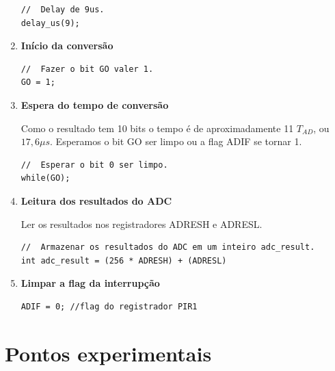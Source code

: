 \documentclass{article}
\begin{document}
\begin{enumerate}
\begin{lstlisting}[style = Matlab-editor, language = C2]
//  Delay de 9us.
delay_us(9);\end{lstlisting}
    
    \item \textbf{Início da conversão} \par

    \begin{lstlisting}[style = Matlab-editor, language = C2]
//  Fazer o bit GO valer 1.
GO = 1;\end{lstlisting}

    \item \textbf{Espera do tempo de conversão} \par
    Como o resultado tem 10 bits o tempo é de aproximadamente 11 $T_{AD}$, ou $17,6\mu s$.
    Esperamos o bit GO ser limpo ou a flag ADIF se tornar 1.

    \begin{lstlisting}[style = Matlab-editor, language = C2]
//  Esperar o bit 0 ser limpo.
while(GO);\end{lstlisting}
    
    \item \textbf{Leitura dos resultados do ADC} \par

    Ler os resultados nos registradores ADRESH e ADRESL.

    \begin{lstlisting}[style = Matlab-editor, language = C2]
//  Armazenar os resultados do ADC em um inteiro adc_result.
int adc_result = (256 * ADRESH) + (ADRESL)\end{lstlisting}
    
    \item \textbf{Limpar a flag da interrupção} \par

    \begin{lstlisting}[style = Matlab-editor, language = C2]
ADIF = 0; //flag do registrador PIR1\end{lstlisting}

    
\end{enumerate}


\section{Pontos experimentais}
\end{document}
